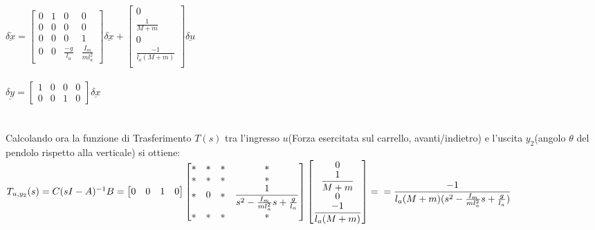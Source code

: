 $\underline{\delta\dot{x}}=
\begin{bmatrix}
0&1&0&0\\
0&0&0&0\\
0&0&0&1\\
0&0&\displaystyle\frac{-g}{l_a}&\displaystyle\frac{I_m}{ml_a^2}
\end{bmatrix}
\underline{\delta x}+
\begin{bmatrix}
0\\
\displaystyle\frac{1}{M+m}\\
0\\
\displaystyle\frac{-1}{l_a(M+m)}\\
\end{bmatrix}
\underline{\delta u}
$\\\\
$\underline{\delta y}=
\begin{bmatrix}
1&0&0&0\\
0&0&1&0
\end{bmatrix}
\underline{\delta x}
$\\\\\\
Calcolando ora la funzione di Trasferimento $T(s)$ tra l'ingresso $u$(Forza esercitata sul carrello,
avanti/indietro) e l'uscita $y_2$(angolo $\theta$ del pendolo rispetto alla verticale) si ottiene:\\
$T_{u,y_2}(s)=C(sI-A)^{-1}B=
\begin{bmatrix}
0&0&1&0
\end{bmatrix}
\begin{bmatrix}
*&*&*&*\\
*&*&*&*\\
*&0&*&\displaystyle\frac{1}{s^2-\frac{I_m}{ml_a^2}s+\frac{g}{l_a}}\\
*&*&*&*
\end{bmatrix}
\begin{bmatrix}
0\\
\displaystyle\frac{1}{M+m}\\
0\\
\displaystyle\frac{-1}{l_a(M+m)}\\
\end{bmatrix} = \\
=\displaystyle\frac{-1}{l_a(M+m)(s^2-\frac{I_m}{ml_a^2}s+\frac{g}{l_a})}
$

